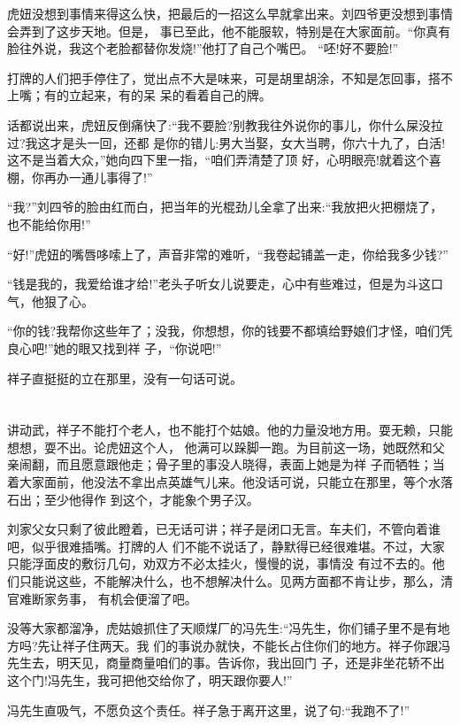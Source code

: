\documentclass[11pt,a4paper,onecolumn]{article}
\begin{document}
虎妞没想到事情来得这么快，把最后的一招这么早就拿出来。刘四爷更没想到事情会弄到了这步天地。但是，
事已至此，他不能服软，特别是在大家面前。``你真有脸往外说，我这个老脸都替你发烧!''他打了自己个嘴巴。
``呸!好不要脸!''

打牌的人们把手停住了，觉出点不大是味来，可是胡里胡涂，不知是怎回事，搭不上嘴；有的立起来，有的呆
呆的看着自己的牌。

话都说出来，虎妞反倒痛快了:``我不要脸?别教我往外说你的事儿，你什么屎没拉过?我这才是头一回，还都
是你的错儿:男大当娶，女大当聘，你六十九了，白活!这不是当着大众，''她向四下里一指，``咱们弄清楚了顶
好，心明眼亮!就着这个喜棚，你再办一通儿事得了!''

``我?''刘四爷的脸由红而白，把当年的光棍劲儿全拿了出来:``我放把火把棚烧了，也不能给你用!''

``好!''虎妞的嘴唇哆嗦上了，声音非常的难听，``我卷起铺盖一走，你给我多少钱?''

``钱是我的，我爱给谁才给!''老头子听女儿说要走，心中有些难过，但是为斗这口气，他狠了心。

``你的钱?我帮你这些年了；没我，你想想，你的钱要不都填给野娘们才怪，咱们凭良心吧!''她的眼又找到祥
子，``你说吧!''

祥子直挺挺的立在那里，没有一句话可说。

\pagebreak
\section{}

讲动武，祥子不能打个老人，也不能打个姑娘。他的力量没地方用。耍无赖，只能想想，耍不出。论虎妞这个人，
他满可以跺脚一跑。为目前这一场，她既然和父亲闹翻，而且愿意跟他走；骨子里的事没人晓得，表面上她是为祥
子而牺牲；当着大家面前，他没法不拿出点英雄气儿来。他没话可说，只能立在那里，等个水落石出；至少他得作
到这个，才能象个男子汉。

刘家父女只剩了彼此瞪着，已无话可讲；祥子是闭口无言。车夫们，不管向着谁吧，似乎很难插嘴。打牌的人
们不能不说话了，静默得已经很难堪。不过，大家只能浮面皮的敷衍几句，劝双方不必太挂火，慢慢的说，事情没
有过不去的。他们只能说这些，不能解决什么，也不想解决什么。见两方面都不肯让步，那么，清官难断家务事，
有机会便溜了吧。

没等大家都溜净，虎姑娘抓住了天顺煤厂的冯先生:``冯先生，你们铺子里不是有地方吗?先让祥子住两天。我
们的事说办就快，不能长占住你们的地方。祥子你跟冯先生去，明天见，商量商量咱们的事。告诉你，我出回门
子，还是非坐花轿不出这个门!冯先生，我可把他交给你了，明天跟你要人!''

冯先生直吸气，不愿负这个责任。祥子急于离开这里，说了句:``我跑不了!''
\end{document}
